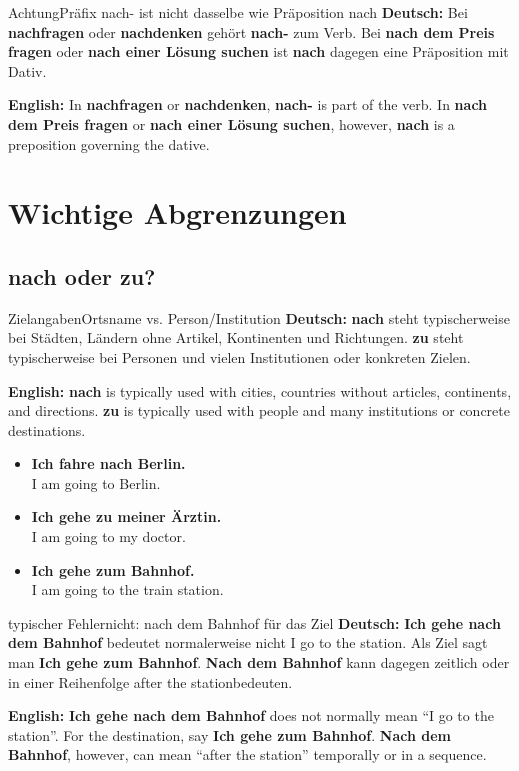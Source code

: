 \documentclass[a4paper,11pt]{article}
\newcommand{\GermanText}[1]{\textbf{Deutsch: }#1\par}
\newcommand{\EnglishText}[1]{{\small\color{SoftGray}\textbf{English: }#1\par}}
\newcommand{\ExampleItem}[2]{\item \textbf{#1}\\{\small\color{SoftGray}#2}}
\begin{document}
        \begin{grammarentry}{Achtung}{Präfix nach- ist nicht dasselbe wie Präposition nach}
            \GermanText{Bei \textbf{nachfragen} oder \textbf{nachdenken} gehört \textbf{nach-} zum Verb. Bei \textbf{nach dem Preis fragen} oder \textbf{nach einer Lösung suchen} ist \textbf{nach} dagegen eine Präposition mit Dativ.}
            \EnglishText{In \textbf{nachfragen} or \textbf{nachdenken}, \textbf{nach-} is part of the verb. In \textbf{nach dem Preis fragen} or \textbf{nach einer Lösung suchen}, however, \textbf{nach} is a preposition governing the dative.}
        \end{grammarentry}


    \section{Wichtige Abgrenzungen}

        \subsection{nach oder zu?}

        \begin{grammarentry}{Zielangaben}{Ortsname vs. Person/Institution}
            \GermanText{\textbf{nach} steht typischerweise bei Städten, Ländern ohne Artikel, Kontinenten und Richtungen. \textbf{zu} steht typischerweise bei Personen und vielen Institutionen oder konkreten Zielen.}
            \EnglishText{\textbf{nach} is typically used with cities, countries without articles, continents, and directions. \textbf{zu} is typically used with people and many institutions or concrete destinations.}
        \end{grammarentry}

        \begin{exbox}
            \begin{itemize}
                \ExampleItem{Ich fahre nach Berlin.}{I am going to Berlin.}
                \ExampleItem{Ich gehe zu meiner Ärztin.}{I am going to my doctor.}
                \ExampleItem{Ich gehe zum Bahnhof.}{I am going to the train station.}
            \end{itemize}
        \end{exbox}

        \begin{grammarentry}{typischer Fehler}{nicht: nach dem Bahnhof für das Ziel}
            \GermanText{\textbf{Ich gehe nach dem Bahnhof} bedeutet normalerweise nicht \glqq I go to the station\grqq. Als Ziel sagt man \textbf{Ich gehe zum Bahnhof}. \textbf{Nach dem Bahnhof} kann dagegen zeitlich oder in einer Reihenfolge \glqq after the station\grqq bedeuten.}
            \EnglishText{\textbf{Ich gehe nach dem Bahnhof} does not normally mean ``I go to the station''. For the destination, say \textbf{Ich gehe zum Bahnhof}. \textbf{Nach dem Bahnhof}, however, can mean ``after the station'' temporally or in a sequence.}
        \end{grammarentry}
\end{document}
